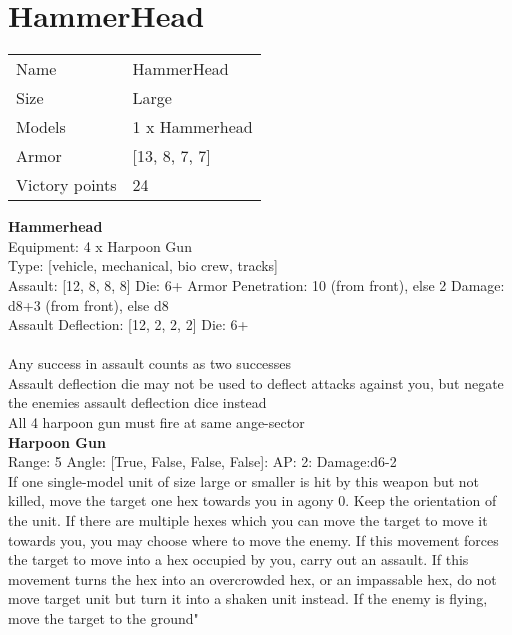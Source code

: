 \pagebreak

\section{ HammerHead }

\begin{tabular}{ll}
  Name & HammerHead \\
  Size & Large\\
  Models & 1 x Hammerhead\\
  Armor & [13, 8, 7, 7]\\
  Victory points & 24\\
\end{tabular}



{\bf Hammerhead } \\
Equipment: 4 x Harpoon Gun \\
Type: [vehicle, mechanical, bio crew, tracks] \\

Assault: [12, 8, 8, 8] Die: 6+ Armor Penetration: 10 (from front), else 2 Damage: d8+3 (from front), else d8 \\
Assault Deflection: [12, 2, 2, 2] Die: 6+\\
\\
Any success in assault counts as two successes \\
Assault deflection die may not be used to deflect attacks against you, but negate the enemies assault deflection dice instead\\ 
 

All 4 harpoon gun must fire at same ange-sector\\ 


{\bf Harpoon Gun } \\



Range: 5  Angle: [True, False, False, False]: AP: 2: Damage:d6-2 \\
If one single-model unit of size large or smaller is hit by this weapon but not killed, move the target one hex towards you in agony 0. Keep the orientation of the unit. If there are multiple hexes which you can move the target to move it towards you, you may choose where to move the enemy. If this movement forces the target to move into a hex occupied by you, carry out an assault. If this movement turns the hex into an overcrowded hex, or an impassable hex, do not move target unit but turn it into a shaken unit instead. If the enemy is flying, move the target to the ground"





